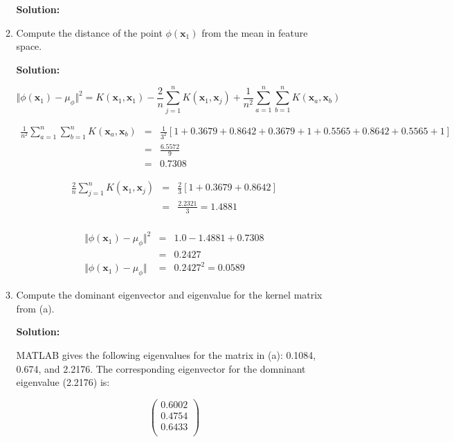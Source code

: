 \documentclass[11pt]{article}
\begin{document}
\begin{enumerate}
\begin{enumerate}
\textbf{Solution:}

\item Compute the distance of the point $\phi(\mathbf{x}_1)$ from the mean in feature space.

\textbf{Solution:}

\begin{equation*}
\Vert \phi(\mathbf{x}_1) - \mu_\phi \Vert^2 = K(\mathbf{x}_1,\mathbf{x}_1) - \frac{2}{n} \sum\limits_{j=1}^n K(\mathbf{x}_1,\mathbf{x}_j) + \frac{1}{n^2} \sum\limits_{a=1}^n \sum\limits_{b=1}^n K(\mathbf{x}_a,\mathbf{x}_b)
\end{equation*}

\begin{eqnarray*}
\frac{1}{n^2} \sum\limits_{a=1}^n \sum\limits_{b=1}^n K(\mathbf{x}_a,\mathbf{x}_b) 
&=& \frac{1}{3^2} \left[ 1 + 0.3679 + 0.8642 + 0.3679 + 1 + 0.5565 + 0.8642 + 0.5565 + 1 \right] \\
&=& \frac{6.5572}{9} \\
&=& 0.7308
\end{eqnarray*}

\begin{eqnarray*}
\frac{2}{n} \sum\limits_{j=1}^n K(\mathbf{x}_1,\mathbf{x}_j) &=& \frac{2}{3} \left[1 + 0.3679 + 0.8642 \right] \\
&=& \frac{2.2321}{3} = 1.4881 \\
\end{eqnarray*}

\begin{eqnarray*}
\Vert \phi(\mathbf{x}_1) - \mu_\phi \Vert^2 &=& 1.0 - 1.4881 + 0.7308 \\
&=& 0.2427 \\
\Vert \phi(\mathbf{x}_1) - \mu_\phi \Vert &=& 0.2427^2 = 0.0589
\end{eqnarray*}

\item Compute the dominant eigenvector and eigenvalue for the kernel matrix from (a).

\textbf{Solution:}

MATLAB gives the following eigenvalues for the matrix in (a): 0.1084, 0.674, and 2.2176. The corresponding eigenvector for the domninant eigenvalue (2.2176) is:

\begin{equation*}
\left(\begin{array}{c}
0.6002 \\
0.4754 \\
0.6433 \\
\end{array}\right)
\end{equation*}


\end{enumerate}
\end{enumerate}
\end{document}
